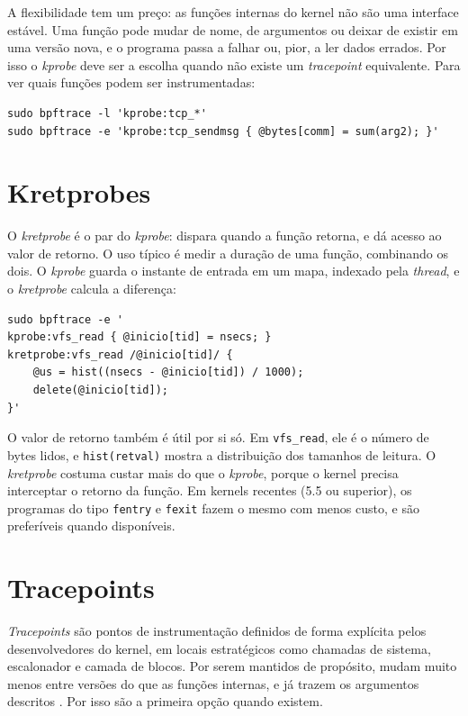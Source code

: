 A flexibilidade tem um preço: as funções internas do kernel não são uma interface estável. Uma função pode mudar de nome, de argumentos ou deixar de existir em uma versão nova, e o programa passa a falhar ou, pior, a ler dados errados. Por isso o \textit{kprobe} deve ser a escolha quando não existe um \textit{tracepoint} equivalente. Para ver quais funções podem ser instrumentadas:

\begin{lstlisting}
sudo bpftrace -l 'kprobe:tcp_*'
sudo bpftrace -e 'kprobe:tcp_sendmsg { @bytes[comm] = sum(arg2); }'
\end{lstlisting}

\section{Kretprobes}

O \textit{kretprobe} é o par do \textit{kprobe}: dispara quando a função retorna, e dá acesso ao valor de retorno. O uso típico é medir a duração de uma função, combinando os dois. O \textit{kprobe} guarda o instante de entrada em um mapa, indexado pela \textit{thread}, e o \textit{kretprobe} calcula a diferença:

\begin{lstlisting}
sudo bpftrace -e '
kprobe:vfs_read { @inicio[tid] = nsecs; }
kretprobe:vfs_read /@inicio[tid]/ {
    @us = hist((nsecs - @inicio[tid]) / 1000);
    delete(@inicio[tid]);
}'
\end{lstlisting}

O valor de retorno também é útil por si só. Em \texttt{vfs\_read}, ele é o número de bytes lidos, e \texttt{hist(retval)} mostra a distribuição dos tamanhos de leitura. O \textit{kretprobe} costuma custar mais do que o \textit{kprobe}, porque o kernel precisa interceptar o retorno da função. Em kernels recentes (5.5 ou superior), os programas do tipo \texttt{fentry} e \texttt{fexit} fazem o mesmo com menos custo, e são preferíveis quando disponíveis.

\section{Tracepoints}

\textit{Tracepoints} são pontos de instrumentação definidos de forma explícita pelos desenvolvedores do kernel, em locais estratégicos como chamadas de sistema, escalonador e camada de blocos. Por serem mantidos de propósito, mudam muito menos entre versões do que as funções internas, e já trazem os argumentos descritos \cite{linuxkernel2024}. Por isso são a primeira opção quando existem.

